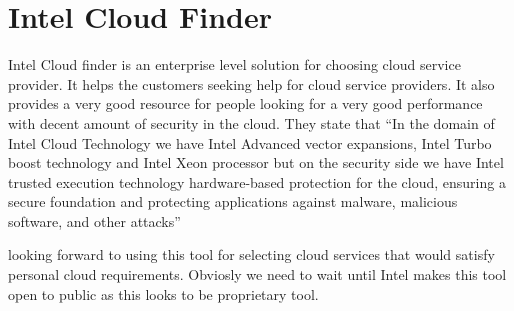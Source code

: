 \section{Intel Cloud Finder}



Intel Cloud finder is an enterprise level solution for choosing cloud
service provider. It helps the customers seeking help for cloud
service providers. It also provides a very good resource for people
looking for a very good performance with decent amount of security in
the cloud. They state that ``In the domain of Intel Cloud Technology
we have Intel Advanced vector expansions, Intel Turbo boost technology
and Intel Xeon processor but on the security side we have Intel
trusted execution technology hardware-based protection for the cloud,
ensuring a secure foundation and protecting applications against
malware, malicious software, and other attacks''~\cite{hid-sp18-410-Intel}

looking forward to using this tool for selecting cloud
services that would satisfy personal cloud requirements. Obviosly we need to
wait until Intel makes this tool open to public as this looks to be
proprietary tool.
